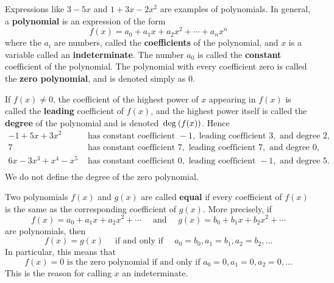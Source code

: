 
Expressions like $3 - 5x$ and $1 + 3x - 2x^{2}$ are examples of polynomials. In general, a \textbf{polynomial} is an expression of the form
\begin{equation*}
f(x) = a_0 + a_1x + a_2x^2 + \cdots + a_n x^n
\end{equation*}
where the $a_i$ are numbers, called the \textbf{coefficients} of the polynomial, and $x$ is a variable called an \textbf{indeterminate}. The number $a_{0}$ is called the \textbf{constant} coefficient of the polynomial. The polynomial with every coefficient zero is called the \textbf{zero polynomial}, and is denoted simply as $0$.


If $f(x) \neq 0$, the coefficient of the highest power of $x$ appearing in $f(x)$ is called the \textbf{leading} coefficient of $f(x)$, and the highest power itself is called the \textbf{degree} of the polynomial and is denoted $\thinspace\operatorname{deg\medspace}(f(x))$. Hence
\begin{equation*}
\begin{array}{ll}
-1+5x+3x^2 & \mbox{ has constant coefficient } -1, \mbox{ leading coefficient } 3, \mbox{ and degree } 2, \\
7  & \mbox{ has constant coefficient } 7, \mbox{ leading coefficient } 7, \mbox{ and degree } 0, \\
6x - 3x^3 + x^4 - x^5 & \mbox{ has constant coefficient } 0, \mbox{ leading coefficient } -1, \mbox{ and degree } 5. \\
\end{array}
\end{equation*}
We do not define the degree of the zero polynomial. 


Two polynomials $f(x)$ and $g(x)$ are called \textbf{equal} if every coefficient of $f(x)$ is the same as the corresponding coefficient of $g(x)$. More precisely, if
\begin{equation*}
f(x) = a_0 + a_1x + a_2x^2 + \cdots \quad \mbox{ and } \quad g(x) = b_0 + b_1x + b_2x^2 + \cdots
\end{equation*}
are polynomials, then
\begin{equation*}
f(x) = g(x) \quad \mbox{ if and only if } \quad a_0 = b_0, a_1 = b_1, a_2 = b_2, \dots
\end{equation*}
In particular, this means that
\begin{equation*}
f(x) = 0 \mbox{ is the zero polynomial if and only if } a_0 = 0, a_1 = 0, a_2 = 0, \dots
\end{equation*}
This is the reason for calling $x$ an indeterminate.


